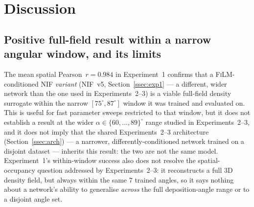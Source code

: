 \documentclass[aip,amsmath,amssymb,reprint]{revtex4-1}
\renewcommand{\ang}{\ensuremath{\alpha}} %
\newcommand{\nif}{\textsc{NIF}}
\newcommand{\film}{\textsc{FiLM}}
\begin{document}
\section{Discussion}
\label{sec:discussion}

\subsection{Positive full-field result within a narrow angular window, and its limits}
\label{ssec:disc_scalar}

The mean spatial Pearson~$r = 0.984$ in Experiment~1 confirms that
a \film{}-conditioned \nif{} \emph{variant} (\nif{}~v5,
Section~\ref{ssec:exp1} — a different, wider network than the one
used in Experiments~2--3) is a viable full-field density surrogate
within the narrow $[75^{\circ},87^{\circ}]$ window it was trained and evaluated
on. This is useful for fast parameter sweeps restricted to that
window, but it does not establish a result at the wider
$\ang \in \{60,\ldots,89\}^{\circ}$ range studied in Experiments~2--3,
and it does not imply that the shared Experiments~2--3 architecture
(Section~\ref{ssec:arch}) — a narrower, differently-conditioned
network trained on a disjoint dataset — inherits this result:
the two are not the same model. Experiment~1's within-window
success also does not resolve the spatial-occupancy question
addressed by Experiments~2--3: it reconstructs a full 3D density
field, but always within the same 7 trained angles, so it says
nothing about a network's ability to generalise \emph{across} the
full deposition-angle range or to a disjoint angle set.
\end{document}
